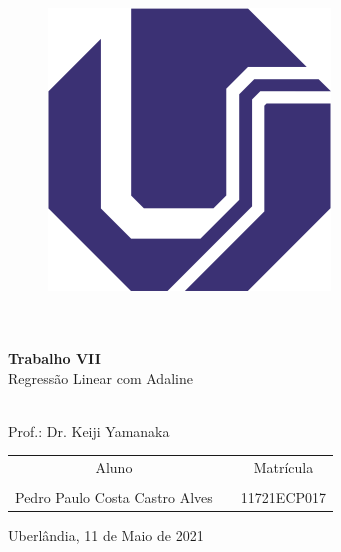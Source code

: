 \documentclass{tcc}
\begin{document}
\pagestyle{empty} %


\begin{center}
\Huge{\bf \thetitle}\\~\\
\begin{figure}[H]
\centering
\includegraphics{imagens/UFU.png}
\end{figure}
\huge{\bf \subtitulo}\\~\\
\Large{\bf Trabalho VII} \\
Regressão Linear com Adaline\\~\\

\end{center}

\vspace{2em}

\begin{center}
Prof.: Dr. Keiji Yamanaka

\end{center}

\vspace{2em}
\begin{table}[htb]
\centering
\begin{tabular}{ccc}
Aluno                           &  & Matrícula   \\
                                &  &             \\
Pedro Paulo Costa Castro Alves  &  & 11721ECP017 \\
\end{tabular}
\end{table}


\vspace{5cm}


\begin{center}
Uberlândia, 11 de Maio de 2021
\end{center}
\clearpage
\setcounter{page}{1}



\pagestyle{plain} %

\newpage


\end{document}
